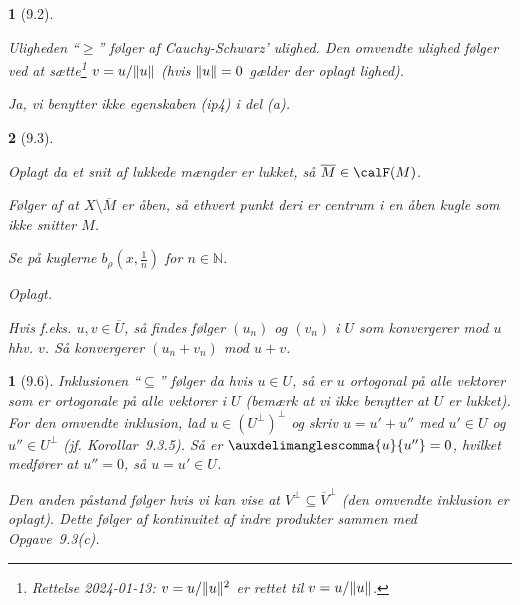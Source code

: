 \documentclass[a4paper, 11pt, article, danish, oneside]{memoir}
\title{\doctitle}
\author{\docauthor}
\newcommand{\naturals}{\mathbb{N}}
\newcommand{\blank}{\mathrel{\;\cdot\;}}
\newcommand{\blankifempty}[1]{\ifstrempty{#1}{\blank}{#1}}
\DeclarePairedDelimiter{\auxdelimlVert}{\lVert}{\rVert}
\newcommand{\norm}[1]{\auxdelimlVert{\blankifempty{#1}}}
\newcommand{\inner}[2]{\auxdelimanglescomma{\blankifempty{#1}}{\blankifempty{#2}}}
\newcommand{\pencilsymbol}{\raisebox{-2pt}{\normalfont\PencilLeft}}
\theoremstyle{changedotcustomnumber}
\newtheorem{opgave}{\pencilsymbol}
\theoremstyle{changedotbreakcustomnumber}
\newtheorem{opgavebreak}{\pencilsymbol}
\begin{document}
\maketitle

\begin{opgavebreak}[9.2]
\begin{solutionsec}
    \item Uligheden \enquote{$\geq$} følger af Cauchy-Schwarz' ulighed. Den omvendte ulighed følger ved at sætte\footnote{Rettelse 2024-01-13: $v = u/\norm{u}^2$ er rettet til $v = u/\norm{u}$.} $v = u/\norm{u}$ (hvis $\norm{u} = 0$ gælder der oplagt lighed).

    \item Ja, vi benytter ikke egenskaben (ip4) i del (a).
\end{solutionsec}
\end{opgavebreak}


\begin{opgavebreak}[9.3]
\begin{solutionsec}
    \item Oplagt da et snit af lukkede mængder er lukket, så $\overline{M} \in \calF(M)$.

    \item Følger af at $X \setminus \overline{M}$ er åben, så ethvert punkt deri er centrum i en åben kugle som ikke snitter $M$.

    \item Se på kuglerne $b_\rho(x,\tfrac{1}{n})$ for $n \in \naturals$.

    \item Oplagt.

    \item Hvis f.eks. $u,v \in \overline{U}$, så findes følger $(u_n)$ og $(v_n)$ i $U$ som konvergerer mod $u$ hhv. $v$. Så konvergerer $(u_n + v_n)$ mod $u + v$.
\end{solutionsec}
\end{opgavebreak}


\begin{opgave}[9.6]
    Inklusionen \enquote{$\subseteq$} følger da hvis $u \in U$, så er $u$ ortogonal på alle vektorer som er ortogonale på alle vektorer i $U$ (bemærk at vi ikke benytter at $U$ er lukket). For den omvendte inklusion, lad $u \in (U^\perp)^\perp$ og skriv $u = u' + u''$ med $u' \in U$ og $u'' \in U^\perp$ (jf. Korollar~9.3.5). Så er $\inner{u}{u''} = 0$, hvilket medfører at $u'' = 0$, så $u = u' \in U$.

    Den anden påstand følger hvis vi kan vise at $V^\perp \subseteq \overline{V}^\perp$ (den omvendte inklusion er oplagt). Dette følger af kontinuitet af indre produkter sammen med Opgave~9.3(c).
\end{opgave}
\end{document}
